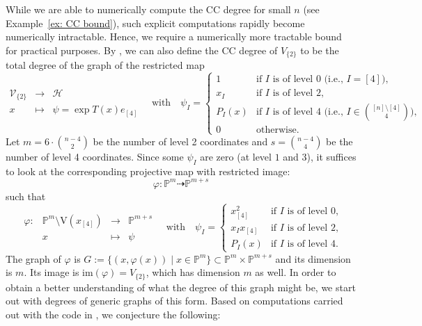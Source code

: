 \documentclass[11pt,reqno]{amsart}
\theoremstyle{definition}
\numberwithin{theorem}{section}
\numberwithin{equation}{section}
\begin{document}
\noindent While we are able to numerically compute the CC degree for small $n$ (see Example~\ref{ex: CC bound}), such explicit computations rapidly become numerically intractable. Hence, we require a numerically more tractable bound for practical purposes.
By \cite[Theorem~26]{sverrisdottir2025algebraic}, we can also define the CC degree of $V_{\{2\}}$ to be the total degree of the graph of the restricted map 
\[ \begin{matrix}
    \mathcal V_{\{2\}} & \longrightarrow & \mathcal H \\
    x & \mapsto &  \psi = \exp T(x) e_{[4]} 
    \end{matrix} \quad \textrm{with} \quad \psi_I
= \begin{cases}
    1 & \text{if $I$ is of level $0$ (i.e., $I=[4]$),}\\
    x_{I} & \text{if $I$ is of level $2$,}\\
    P_I(x) & \text{if $I$ is of level $4$ (i.e., $I \in \binom{[n]\setminus [4]}{4}$)}, \\
    0 & \text{otherwise.}
\end{cases} 
\]
Let $m= 6 \cdot {{n-4} \choose 2}$ be the number of level 2 coordinates and $s={{n-4} \choose 4}$ be the number of level 4 coordinates.
Since some $\psi_I$ are zero (at level $1$ and $3$), it suffices to look at the corresponding projective map with restricted image:
$$ \varphi: \mathbb P^m  \dashrightarrow \mathbb P^{m+s} $$
such that
\[ \begin{matrix}
\varphi: & \mathbb P^m \setminus \textrm{V}(x_{[4]}) & \longrightarrow & \mathbb P^{m+s} \\
& x & \mapsto & \psi 
\end{matrix} \quad \text{with} \quad \psi_I = \begin{cases}
    x_{[4]}^2 & \text{if $I$ is of level $0$,}\\
    x_{I}x_{[4]} & \text{if $I$ is of level $2$,}\\
    P_I(x) & \text{if $I$ is of level $4$}.
\end{cases} 
\]
The graph of $\varphi$ is $G:= \{(x,\varphi(x)) \mid x \in \mathbb P^m \} \subset \mathbb P^m \times \mathbb P^{m+s}$ and its dimension is $m$. Its image is $\text{im}(\varphi) = V_{\{2\}}$, which has dimension $m$ as well. In order to obtain a better understanding of what the degree of this graph might be, we start out with degrees of generic graphs of this form. Based on computations carried out with the code in \cite{Faulstich2025SupplementaryCode}, we conjecture the following:
\end{document}
